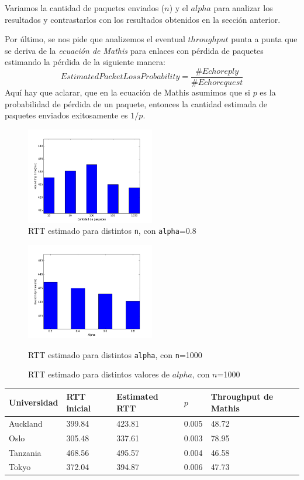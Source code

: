 \documentclass[final,inline,a4paper,narroweqnarray]{ieee}
\begin{document}
Variamos la cantidad de paquetes enviados ($n$) y el $alpha$ para analizar los
resultados y contrastarlos con los resultados obtenidos en la sección anterior.

Por último, se nos pide que analizemos el eventual $throughput$ punta a punta
que se deriva de la \emph{ecuación de Mathis} para enlaces con pérdida de
paquetes estimando la pérdida de la siguiente manera:
\[
EstimatedPacketLossProbability = \dfrac{\#Echo reply}{\#Echo request}
\]
Aquí hay que aclarar, que en la ecuación de Mathis asumimos que si $p$ es la
probabilidad de pérdida de un paquete, entonces la cantidad estimada de paquetes
enviados exitosamente es $1/p$.

\begin{figure}[ht]\begin{center}
   \includegraphics[width=0.5\textwidth]{imagenes/auckland-estimate-alpha-08.png}
    \caption{RTT estimado para distintos \texttt{n}, con \texttt{alpha}=0.8}
    \label{auckland-estimate-alpha-08}
\end{center}\end{figure}

\begin{figure}[ht]\begin{center}
   \includegraphics[width=0.5\textwidth]{imagenes/auckland-estimate-n-1000.png}
    \caption{RTT estimado para distintos \texttt{alpha}, con \texttt{n}=1000}
    \caption{RTT estimado para distintos valores de $alpha$, con $n$=1000}
    \label{auckland-estimate-n-1000}
\end{center}\end{figure}

\begin{tabular}{| p{1.6cm} | p{1.2cm} | p{1.4cm} | p{1.2cm} | p{1.7cm} |}
  \hline
  Universidad & RTT inicial & Estimated RTT & $p$ & Throughput de Mathis \\
  \hline
  Auckland & 399.84 & 423.81 & 0.005 & 48.72 \\
  Oslo & 305.48 & 337.61 & 0.003 & 78.95 \\
  Tanzania & 468.56 & 495.57 & 0.004 & 46.58 \\
  Tokyo & 372.04 & 394.87 & 0.006 & 47.73 \\
  \hline
\end{tabular}
\end{document}
